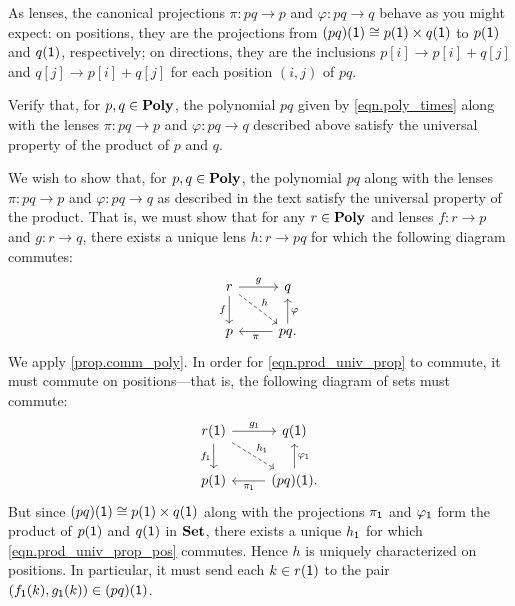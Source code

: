 \documentclass[Book-Poly]{subfiles}
\begin{document}
As lenses, the canonical projections $\pi \colon pq \to p$ and $\varphi \colon pq \to q$ behave as you might expect: on positions, they are the projections from $(pq)(\textsf{1}) \cong p(\textsf{1}) \times q(\textsf{1})$ to $p(\textsf{1})$ and $q(\textsf{1})$, respectively; on directions, they are the inclusions $p[i] \to p[i] + q[j]$ and $q[j] \to p[i] + q[j]$ for each position $(i, j)$ of $pq$.

\begin{exercise} \label{exc.poly_prod}
Verify that, for $p, q \in \mathbf{Poly}$, the polynomial $pq$ given by \eqref{eqn.poly_times} along with the lenses $\pi \colon pq \to p$ and $\varphi \colon pq \to q$ described above satisfy the universal property of the product of $p$ and $q$.
\begin{solution}
We wish to show that, for $p, q \in \mathbf{Poly}$, the polynomial $pq$ along with the lenses $\pi \colon pq \to p$ and $\varphi \colon pq \to q$ as described in the text satisfy the universal property of the product.
That is, we must show that for any $r \in \mathbf{Poly}$ and lenses $f \colon r \to p$ and $g \colon r \to q$, there exists a unique lens $h \colon r \to pq$ for which the following diagram commutes:
\begin{equation} \label{eqn.prod_univ_prop}
\begin{tikzcd}
	r \ar[d, "f"'] \ar[r, "g"] \ar[dr, "h", dashed] & q \\
	p & pq. \ar[l, "\pi"] \ar[u, "\varphi"']
\end{tikzcd}
\end{equation}
We apply \cref{prop.comm_poly}.
In order for \eqref{eqn.prod_univ_prop} to commute, it must commute on positions---that is, the following diagram of sets must commute:
\begin{equation} \label{eqn.prod_univ_prop_pos}
\begin{tikzcd}
	r(\1) \ar[d, "f_\1"'] \ar[r, "g_\1"] \ar[dr, "h_\1", dashed] & q(\1) \\
	p(\1) & (pq)(\1). \ar[l, "\pi_\1"] \ar[u, "\varphi_\1"']
\end{tikzcd}
\end{equation}
But since $(pq)(\textsf{1}) \cong p(1) \times q(\textsf{1})$ along with the projections $\pi_{\textsf{1}}$ and $\varphi_{\textsf{1}}$ form the product of $p(\textsf{1})$ and $q(\textsf{1})$ in $\mathbf{Set}$, there exists a unique $h_{\textsf{1}}$ for which \eqref{eqn.prod_univ_prop_pos} commutes.
Hence $h$ is uniquely characterized on positions.
In particular, it must send each $k \in r(\textsf{1})$ to the pair $(f_{\textsf{1}}(k), g_{\textsf{1}}(k)) \in (pq)(\textsf{1})$.


\end{solution}
\end{exercise}
\end{document}
